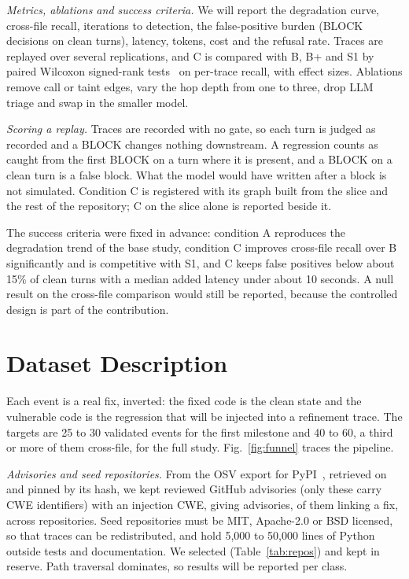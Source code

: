 \documentclass[conference]{IEEEtran}
\begin{document}
\textit{Metrics, ablations and success criteria.} We will report the degradation curve, cross-file recall, iterations to detection, the false-positive burden (BLOCK decisions on clean turns), latency, tokens, cost and the refusal rate. Traces are replayed over several replications, and C is compared with B, B+ and S1 by paired Wilcoxon signed-rank tests~\cite{wilcoxon1945} on per-trace recall, with effect sizes. Ablations remove call or taint edges, vary the hop depth from one to three, drop LLM triage and swap in the smaller model.

\textit{Scoring a replay.} Traces are recorded with no gate, so each turn is judged as recorded and a BLOCK changes nothing downstream. A regression counts as caught from the first BLOCK on a turn where it is present, and a BLOCK on a clean turn is a false block. What the model would have written after a block is not simulated. Condition C is registered with its graph built from the slice and the rest of the repository; C on the slice alone is reported beside it.

The success criteria were fixed in advance: condition A reproduces the degradation trend of the base study, condition C improves cross-file recall over B significantly and is competitive with S1, and C keeps false positives below about 15\% of clean turns with a median added latency under about 10 seconds. A null result on the cross-file comparison would still be reported, because the controlled design is part of the contribution.

\section{Dataset Description}
\label{sec:dataset}

Each event is a real fix, inverted: the fixed code is the clean state and the vulnerable code is the regression that will be injected into a refinement trace. The targets are 25 to 30 validated events for the first milestone and 40 to 60, a third or more of them cross-file, for the full study. Fig.~\ref{fig:funnel} traces the pipeline.

\textit{Advisories and seed repositories.} From the OSV export for PyPI~\cite{osv}, retrieved on \nOsvDate{} and pinned by its hash, we kept reviewed GitHub advisories (only these carry CWE identifiers) with an injection CWE, giving \nInjAdv{} advisories, \nInjAdvWithFix{} of them linking a fix, across \nReposUsable{} repositories. Seed repositories must be MIT, Apache-2.0 or BSD licensed, so that traces can be redistributed, and hold 5,000 to 50,000 lines of Python outside tests and documentation. We selected \nSeedSelected{} (Table~\ref{tab:repos}) and kept \nSeedReserve{} in reserve. Path traversal dominates, so results will be reported per class.
\end{document}
